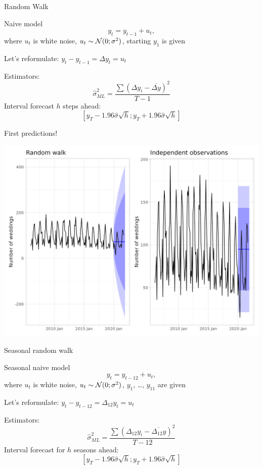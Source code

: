 \begin{frame}{Random Walk}
	
	\begin{block}{Naive model}
		\[
		y_t = y_{t-1} + u_t,
		\]
		where $u_t$ is white noise, $u_t \sim \mathcal{N}(0;\sigma^2)$, starting $y_1$ is given
	\end{block}
	\pause
	Let's reformulate: $y_t - y_{t-1} = \Delta y_t = u_t$
	
	
	\pause
	\alert{Estimators:}
	\[
	\hat\sigma^2_{ML} = \frac{\sum(\Delta y_i - \overline {\Delta y})^2}{T - 1}
	\]
	\pause
	\alert{Interval forecast} $h$ steps ahead:
	\[
	[y_T - 1.96 \hat \sigma \sqrt{h}; y_T + 1.96 \hat \sigma \sqrt{h}]
	\]
\end{frame}

\begin{frame}{First predictions!}
	
	\includegraphics[width=\textwidth]{pictures/om_ts_01-157.png}
	
\end{frame}


\begin{frame}{Seasonal random walk}
	
	\begin{block}{Seasonal naive model}
		\[
		y_t = y_{t-12} + u_t,
		\]
		where $u_t$ is white noise, $u_t \sim \mathcal{N}(0;\sigma^2)$, $y_1$, \ldots, $y_{11}$ are given
	\end{block}
	\pause
	Let's reformulate: $y_t - y_{t-12} = \Delta_{12} y_t = u_t$
	\pause
	
	\alert{Estimators:}
	\[
	\hat\sigma^2_{ML} = \frac{\sum(\Delta_{12} y_i - \overline {\Delta_{12} y})^2}{T - 12}
	\]
	\pause
	\alert{Interval forecast} for $h$ \alert{seasons} ahead:
	\[
	[y_{T} - 1.96 \hat \sigma \sqrt{h}; y_{T} + 1.96 \hat \sigma \sqrt{h}]
	\]
\end{frame}

